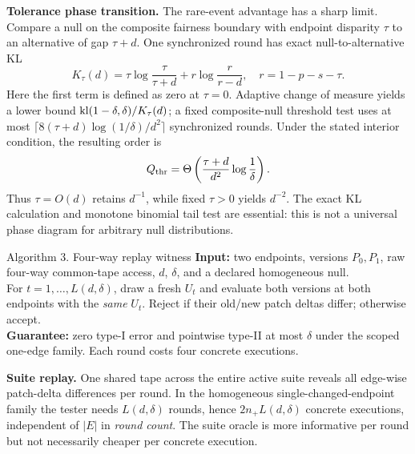 \textbf{Tolerance phase transition.} The rare-event advantage has a sharp limit. Compare a null on the composite fairness boundary with endpoint disparity $\tau$ to an alternative of gap $\tau+d$. One synchronized round has exact null-to-alternative KL
\begin{equation}\label{eq:ktau}
K_\tau(d)=\tau\log\frac{\tau}{\tau+d}+r\log\frac r{r-d},\quad r=1-p-s-\tau.
\end{equation}
Here the first term is defined as zero at $\tau=0$. Adaptive change of measure yields a lower bound $\mathrm{kl}(1-\delta,\delta)/K_\tau(d)$; a fixed composite-null threshold test uses at most $\lceil8(\tau+d)\log(1/\delta)/d^2\rceil$ synchronized rounds. Under the stated interior condition, the resulting order is
\begin{equation}\label{eq:phase}
Q_{\rm thr}=\Theta\left(\frac{\tau+d}{d^2}\log\frac1\delta\right).
\end{equation}
Thus $\tau=O(d)$ retains $d^{-1}$, while fixed $\tau>0$ yields $d^{-2}$. The exact KL calculation and monotone binomial tail test are essential: this is not a universal phase diagram for arbitrary null distributions.

\begin{researchalgorithm}{Algorithm 3. Four-way replay witness}\label{alg:fourway}
\textbf{Input:} two endpoints, versions $P_0,P_1$, raw four-way common-tape access, $d$, $\delta$, and a declared homogeneous null.\\
For $t=1,\ldots,L(d,\delta)$, draw a fresh $U_t$ and evaluate both versions at both endpoints with the \emph{same} $U_t$. Reject if their old/new patch deltas differ; otherwise accept.\\
\textbf{Guarantee:} zero type-I error and pointwise type-II at most $\delta$ under the scoped one-edge family. Each round costs four concrete executions.
\end{researchalgorithm}

\textbf{Suite replay.} One shared tape across the entire active suite reveals all edge-wise patch-delta differences per round. In the homogeneous single-changed-endpoint family the tester needs $L(d,\delta)$ rounds, hence $2n_+L(d,\delta)$ concrete executions, independent of $|E|$ in \emph{round count}. The suite oracle is more informative per round but not necessarily cheaper per concrete execution.

